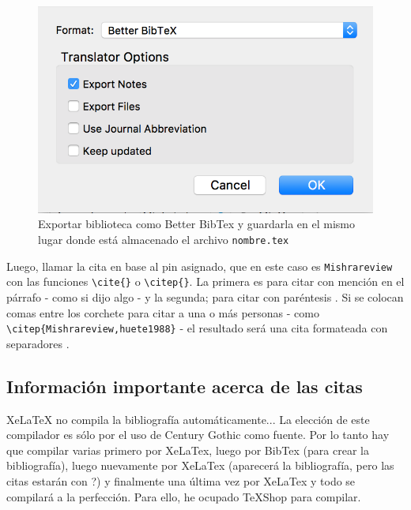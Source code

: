 \documentclass[10pt,]{article}
\begin{document}
\begin{figure}[!h]
\begin{center}
\includegraphics[width=\textwidth]{Figuras/better.png}
\caption{Exportar biblioteca como Better BibTex y guardarla en el mismo lugar donde está almacenado el archivo \texttt{nombre.tex}}
\label{etiqueta_figura5}
\end{center}
\end{figure}

\clearpage

Luego, llamar la cita en base al pin asignado, que en este caso es \verb!Mishrareview! con las funciones \verb!\cite{}! o \verb!\citep{}!. La primera es para citar con mención en el párrafo - como si \cite{Mishrareview} dijo algo - y la segunda; para citar con paréntesis \citep{Mishrareview}. Si se colocan comas entre los corchete para citar a una o más personas - como \verb!\citep{Mishrareview,huete1988}! - el resultado será una cita formateada con separadores \citep{Mishrareview,huete1988}.\\

\subsection{Información importante acerca de las citas\\}

XeLaTeX no compila la bibliografía automáticamente... La elección de este compilador es sólo por el uso de Century Gothic como fuente. Por lo tanto hay que compilar varias primero por XeLaTex, luego por BibTex (para crear la bibliografía), luego nuevamente por XeLaTex (aparecerá la bibliografía, pero las citas estarán con ?) y finalmente una última vez por XeLaTex y todo se compilará a la perfección. Para ello, he ocupado TeXShop para compilar.\\
\end{document}

